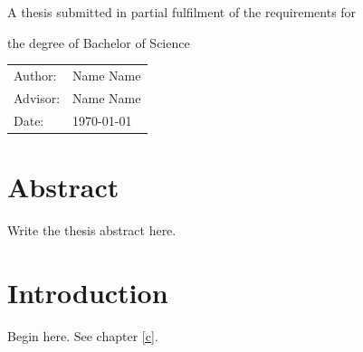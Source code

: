 \documentclass[12pt]{report}
\begin{document}
\begin{titlepage}\centering{}\vspace{1.8in}{\Huge\bfseries Honors thesis title\par}\vspace{.6in}A thesis submitted in partial fulfilment of the requirements for\par the degree of Bachelor of Science\vfill\begin{tabular}{ll}Author:&Name Name\\Advisor:&Name Name\\Date:&\today\end{tabular}\end{titlepage}
\chapter*{Abstract}Write the thesis abstract here.
\chapter{Introduction}Begin here.\label{c}
See chapter \ref{c}.
\end{document}
